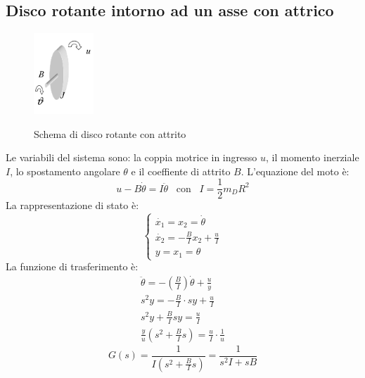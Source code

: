 \documentclass[a4paper]{report}
\begin{document}
\subsection{Disco rotante intorno ad un asse con attrico}\label{par:discorotanteattrito}
\begin{figure}[!b]
  \centering
  \includegraphics[width=0.2\textwidth]{./images/discorotanteattrito.png}
  \label{fig:discorotanteattrito}
  \caption{Schema di disco rotante con attrito\label{fig:discorotanteattrito}}
\end{figure}
Le variabili del sistema sono: la coppia motrice in ingresso $u$, il
momento inerziale $I$, lo spostamento angolare $\theta$ e il coeffiente
di attrito $B$. L'equazione del moto \`e:
$$u - B \dot{\theta} = I \ddot{\theta} \;\;\;\textrm{con}\;\;\; I =
\frac{1}{2} m_D R^2$$
La rappresentazione di stato \`e:
\[
  \left\{
  \begin{array}{l}
    \dot{x_1} = x_2 = \dot{\theta}\\
    \dot{x_2} = -\frac{B}{I}x_2 + \frac{u}{I}\\
    y = x_1 = \theta
  \end{array}\right .
\]
La funzione di trasferimento \`e:
\[
  \begin{array}{l}
    \ddot{\theta} = -(\frac{B}{I})\dot{\theta} + \frac{u}{y}\\
    s^2 y = -\frac{B}{I} \cdot sy + \frac{u}{I}\\
    s^2 y + \frac{B}{I} sy = \frac{u}{I}\\
    \frac{y}{u}(s^2 + \frac{B}{I}s) = \frac{u}{I} \cdot \frac{1}{u}
  \end{array}
\]
$$G(s) = \frac{1}{I(s^2 + \frac{B}{I}s)} = \frac{1}{s^2 I +sB}$$
\end{document}
